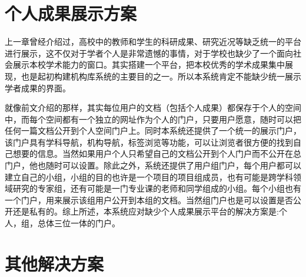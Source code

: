 \section{个人成果展示方案}
\label{sec:display}

上一章曾经介绍过，高校中的教师和学生的科研成果、研究近况等缺乏统一的平台进行展示，这不仅对于学者个人是非常遗憾的事情，对于学校也缺少了一个面向社会展示本校学术能力的窗口。其实搭建一个平台，把本校优秀的学术成果集中展现，也是起初构建机构库系统的主要目的之一。所以本系统肯定不能缺少统一展示学者成果的界面。

就像前文介绍的那样，其实每位用户的文档（包括个人成果）都保存于个人的空间中，而每个空间都有一个独立的网址作为个人的门户，只要用户愿意，随时可以把任何一篇文档公开到个人空间门户上。同时本系统还提供了一个统一的展示门户，该门户具有学科导航，机构导航，标签浏览等功能，可以让浏览者很方便的找到自己想要的信息。当然如果用户个人只希望自己的文档公开到个人门户而不公开在总门户，他也随时可以设置。除此之外，系统还提供了用户组门户，每个用户都可以建立自己的小组，小组的目的也许是一个项目的项目组成员，也有可能是跨学科领域研究的专家组，还有可能是一门专业课的老师和同学组成的小组。每个小组也有一个门户，用来展示该组用户公开到本组的文档。当然组门户也是可以设置是否公开还是私有的。综上所述，本系统应对缺少个人成果展示平台的解决方案是:个人，组，总体三位一体的门户。

\section{其他解决方案}
\label{sec:project}

